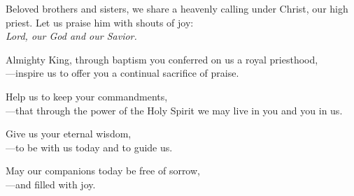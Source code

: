 \intercessions

\begin{raggedright}
Beloved brothers and sisters, we share a heavenly calling under Christ, our high priest. Let us praise him with shouts of joy:\\
\emph{Lord, our God and our Savior.}

\medskip
Almighty King, through baptism you conferred on us a royal priesthood,\\
{\color{red}---}inspire us to offer you a continual sacrifice of praise.

\medskip
Help us to keep your commandments,\\
{\color{red}---}that through the power of the Holy Spirit we may live in you and you in us.

\medskip
Give us your eternal wisdom,\\
{\color{red}---}to be with us today and to guide us.

\medskip
May our companions today be free of sorrow,\\
{\color{red}---}and filled with joy.
\end{raggedright}